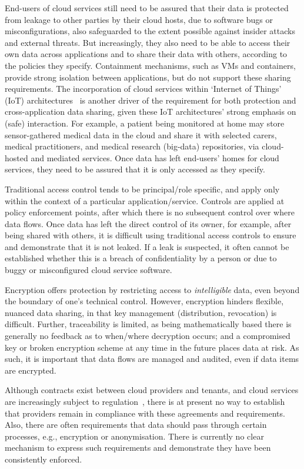 \documentclass[10pt,journal,compsoc]{IEEEtran}
\begin{document}
End-users of cloud services still need to be assured that their data is protected from leakage to other parties by their cloud hosts, due to software bugs or misconfigurations, also safeguarded to the extent possible against insider attacks and external threats. 
But increasingly, they also need to be able to access their own data across applications and to share their data with others, according to the policies they specify. 
Containment mechanisms, such as VMs and containers, provide strong isolation between applications, but do not support these sharing requirements. 
The incorporation of cloud services within `Internet of Things' (IoT) architectures~\cite{mineraud2014} is another driver of the requirement for both protection and cross-application data sharing, given these IoT architectures' strong emphasis on (safe) interaction.
For example, a patient being monitored at home may store sensor-gathered medical data in the cloud and share it with selected carers,  medical practitioners, and medical research (big-data) repositories, via cloud-hosted and mediated services. Once data has left end-users' homes for cloud services, they need to be assured that it is only accessed as they specify. 

Traditional access control tends to be principal/role specific, and apply only within the context of a particular application\slash service. Controls are applied at policy enforcement points, after which there is no subsequent control over where data flows. Once data has left the direct control of its owner, for example, after being shared with others, 
it is difficult using traditional access controls to ensure and demonstrate that it is not leaked. 
If a leak is suspected, it often cannot be established whether this is a breach of confidentiality by a person or due to buggy or misconfigured cloud service software. 

Encryption offers protection by restricting access to {\em intelligible} data, even beyond the boundary of one's technical control. However, encryption hinders flexible, nuanced data sharing, in that key management (distribution, revocation) is difficult. 
Further, traceability is limited, as being mathematically based there
is generally no feedback as to when\slash where decryption occurs; and a compromised key or broken encryption scheme at any time in the future places data at risk. As such, it is important that data flows are managed and audited, even if data items are encrypted.


Although contracts exist between cloud providers and tenants, and cloud services are increasingly subject to regulation~\cite{millard2013cloud}, there is at present no way to establish that providers remain in compliance with these agreements and requirements. Also, there are often requirements that data should pass through certain processes, e.g., encryption or anonymisation. There is currently no clear mechanism to express such requirements and demonstrate they have been consistently enforced.
\end{document}
